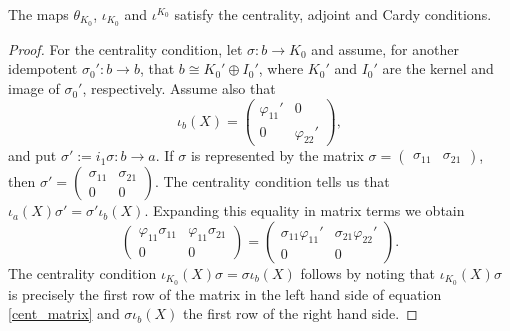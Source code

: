 \begin{theorem}
The maps $\theta_{K_0}$, $\iota_{K_0}$ and $\iota^{K_0}$ satisfy the centrality, adjoint and Cardy conditions.
\end{theorem}
\begin{proof}
For the centrality condition, let $\sigma: b\to K_0$ and assume, for another idempotent $\sigma_0':b\to b$, that $b\cong K_0'\oplus I_0'$, where $K_0'$ and $I_0'$ are the kernel and image of $\sigma_0'$, respectively. Assume also that
$$\iota_b(X)=\left (\begin{smallmatrix} \varphi_{11}' & 0 \\ 0 & \varphi_{22}' \end{smallmatrix} \right ),$$
and put $\sigma':=i_1\sigma :b\to a$. If $\sigma$ is represented by the matrix $\sigma =\left (\begin{smallmatrix} \sigma_{11} & \sigma_{21} \end{smallmatrix} \right )$, then $\sigma'=\left (\begin{smallmatrix} \sigma_{11} & \sigma_{21} \\ 0 & 0 \end{smallmatrix} \right )$. The centrality condition tells us that $\iota_a(X)\sigma'=\sigma'\iota_b(X)$. Expanding this equality in matrix terms we obtain
\begin{equation}\label{cent_matrix}
\left (\begin{smallmatrix} \varphi_{11}\sigma_{11} & \varphi_{11}\sigma_{21} \\ 0 & 0 \end{smallmatrix} \right ) = \left (\begin{smallmatrix} \sigma_{11}\varphi_{11}' & \sigma_{21}\varphi_{22}' \\ 0 & 0 \end{smallmatrix} \right ).
\end{equation}
 The centrality condition $\iota_{K_0}(X)\sigma =\sigma \iota_b(X)$ follows by noting that $\iota_{K_0}(X)\sigma$ is precisely the first row of the matrix in the left hand side of equation \eqref{cent_matrix} and $\sigma \iota_b(X)$ the first row of the right hand side.


\end{proof}
